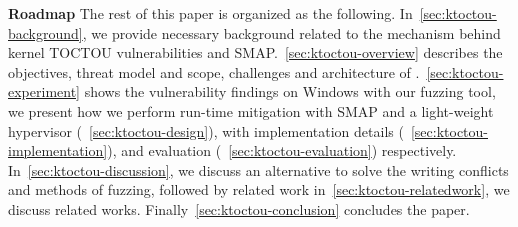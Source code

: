 \textbf{Roadmap}
The rest of this paper is organized as the following. 
In~\autoref{sec:ktoctou-background}, we provide necessary background related to the mechanism behind kernel TOCTOU vulnerabilities and SMAP.~\autoref{sec:ktoctou-overview} describes the objectives, threat model and scope, challenges and architecture of \name.~\autoref{sec:ktoctou-experiment} shows the vulnerability findings on Windows with our fuzzing tool, we present how we perform run-time mitigation with SMAP and a light-weight hypervisor (~\autoref{sec:ktoctou-design}), with implementation details (~\autoref{sec:ktoctou-implementation}), and evaluation (~\autoref{sec:ktoctou-evaluation}) respectively.  In~\autoref{sec:ktoctou-discussion}, we discuss an alternative to solve the writing conflicts and methods of fuzzing, followed by related work in~\autoref{sec:ktoctou-relatedwork}, we discuss related works. Finally~\autoref{sec:ktoctou-conclusion} concludes the paper.
